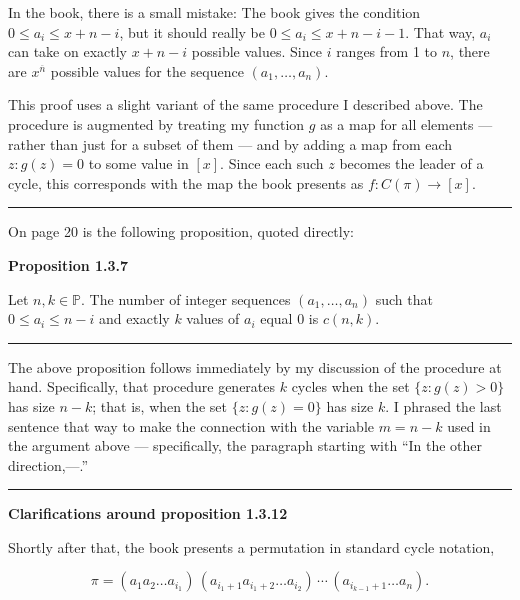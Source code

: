 \documentclass[]{article}
\begin{document}
In the book, there is a small mistake: The book gives the condition
\(0 \le a_i \le x + n - i\), but it should really be
\(0 \le a_i \le x + n - i - 1\). That way, \(a_i\) can take on exactly
\(x + n - i\) possible values. Since \(i\) ranges from 1 to \(n\), there
are \(x^{\overline{n}}\) possible values for the sequence
\((a_1, \ldots, a_n)\).

This proof uses a slight variant of the same procedure I described
above. The procedure is augmented by treating my function \(g\) as a map
for all elements --- rather than just for a subset of them --- and by
adding a map from each \(z : g(z) = 0\) to some value in \([x]\). Since
each such \(z\) becomes the leader of a cycle, this corresponds with the
map the book presents as \(f:C(\pi) \to [x]\).

\begin{center}\rule{0.5\linewidth}{\linethickness}\end{center}

On page 20 is the following proposition, quoted directly:

\textbf{Proposition 1.3.7}

Let \(n, k\in\mathbb{P}\). The number of integer sequences
\((a_1, \ldots, a_n)\) such that \(0 \le a_i \le n-i\) and exactly \(k\)
values of \(a_i\) equal 0 is \(c(n, k)\).

\begin{center}\rule{0.5\linewidth}{\linethickness}\end{center}

The above proposition follows immediately by my discussion of the
procedure at hand. Specifically, that procedure generates \(k\) cycles
when the set \(\{z : g(z) > 0\}\) has size \(n - k\); that is, when the
set \(\{z : g(z) = 0\}\) has size \(k\). I phrased the last sentence
that way to make the connection with the variable \(m = n-k\) used in
the argument above --- specifically, the paragraph starting with ``In
the other direction,---.''

\begin{center}\rule{0.5\linewidth}{\linethickness}\end{center}

\textbf{Clarifications around proposition 1.3.12}

Shortly after that, the book presents a permutation in standard cycle
notation,

\[\pi = (a_1 a_2 \ldots a_{i_1}) \,
        (a_{i_1+1} a_{i_1+2} \ldots a_{i_2}) \, \cdots \,
        (a_{i_{k-1}+1} \ldots a_n).\]
\end{document}
